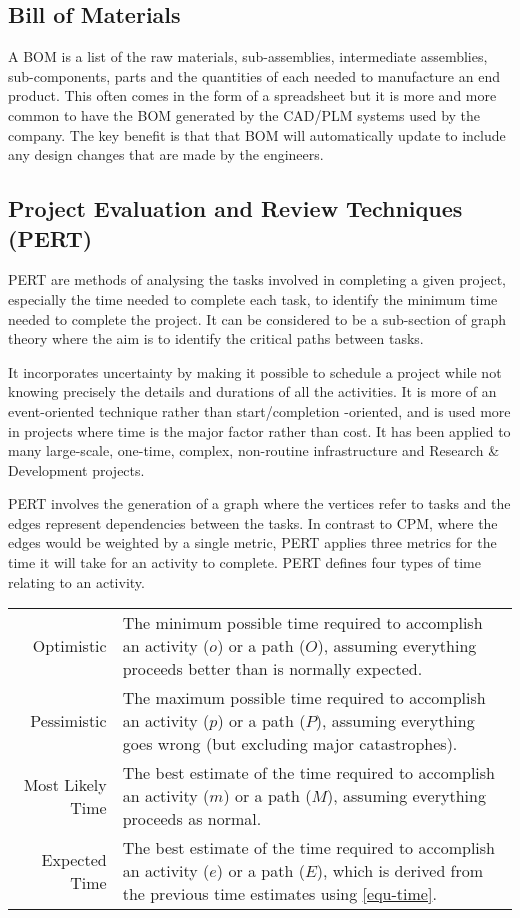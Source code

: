 \subsection{Bill of Materials}

A \acf{BOM} is a list of the raw materials, sub-assemblies, intermediate assemblies, sub-components, parts and the quantities of each needed to manufacture an end product. This often comes in the form of a spreadsheet but it is more and more common to have the \ac{BOM} generated by the \acf{CAD}/\acf{PLM} systems used by the company. The key benefit is that that \ac{BOM} will automatically update to include any design changes that are made by the engineers.


\subsection{Project Evaluation and Review Techniques (PERT)} 

\acf{PERT} are methods of analysing the tasks involved in completing a given project, especially the time needed to complete each task, to identify the minimum time needed to complete the project\cite{vanhoucke2012}. 
It can be considered to be a sub-section of graph theory where the aim is to identify the critical paths between tasks.

It incorporates uncertainty by making it possible to schedule a project while not knowing precisely the details and durations of all the activities. It is more of an event-oriented technique rather than start/completion -oriented, and is used more in projects where time is the major factor rather than cost. It has been applied to many large-scale, one-time, complex, non-routine infrastructure and Research \& Development projects.

\ac{PERT} involves the generation of a graph where the vertices refer to tasks and the edges represent dependencies between the tasks. In contrast to \acf{CPM}, where the edges would be weighted by a single metric, \ac{PERT} applies three metrics for the time it will take for an activity to complete. \ac{PERT} defines four types of time relating to an activity.

\begin{table}
  \small
  \begin{tabular}{r p{}}
    Optimistic & The minimum possible time required to accomplish an activity ($o$) or a path ($O$), assuming everything proceeds better than is normally expected. \\
    Pessimistic & The maximum possible time required to accomplish an activity ($p$) or a path ($P$), assuming everything goes wrong (but excluding major catastrophes). \\
    Most Likely Time & The best estimate of the time required to accomplish an activity ($m$) or a path ($M$), assuming everything proceeds as normal. \\
    Expected Time & The best estimate of the time required to accomplish an activity ($e$) or a path ($E$), which is derived from the previous time estimates using \cref{equ-time}.
  \end{tabular}
\end{table}

